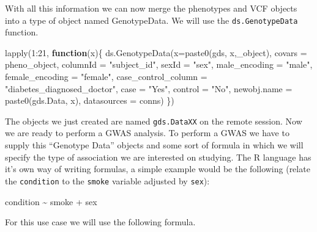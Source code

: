 \documentclass[
]{book}
\newenvironment{Shaded}{\begin{snugshade}}{\end{snugshade}}
\newcommand{\AttributeTok}[1]{\textcolor[rgb]{0.77,0.63,0.00}{#1}}
\newcommand{\ControlFlowTok}[1]{\textcolor[rgb]{0.13,0.29,0.53}{\textbf{#1}}}
\newcommand{\DecValTok}[1]{\textcolor[rgb]{0.00,0.00,0.81}{#1}}
\newcommand{\FunctionTok}[1]{\textcolor[rgb]{0.00,0.00,0.00}{#1}}
\newcommand{\NormalTok}[1]{#1}
\newcommand{\SpecialCharTok}[1]{\textcolor[rgb]{0.00,0.00,0.00}{#1}}
\newcommand{\StringTok}[1]{\textcolor[rgb]{0.31,0.60,0.02}{#1}}
\begin{document}
With all this information we can now merge the phenotypes and VCF objects into a type of object named GenotypeData. We will use the \texttt{ds.GenotypeData} function.

\begin{Shaded}
\begin{Highlighting}[]
\FunctionTok{lapply}\NormalTok{(}\DecValTok{1}\SpecialCharTok{:}\DecValTok{21}\NormalTok{, }\ControlFlowTok{function}\NormalTok{(x)\{}
  \FunctionTok{ds.GenotypeData}\NormalTok{(}\AttributeTok{x=}\FunctionTok{paste0}\NormalTok{(}\StringTok{\textquotesingle{}gds\textquotesingle{}}\NormalTok{, x,}\StringTok{\textquotesingle{}\_object\textquotesingle{}}\NormalTok{), }\AttributeTok{covars =} \StringTok{\textquotesingle{}pheno\_object\textquotesingle{}}\NormalTok{, }\AttributeTok{columnId =} \StringTok{"subject\_id"}\NormalTok{,}
                  \AttributeTok{sexId =} \StringTok{"sex"}\NormalTok{, }\AttributeTok{male\_encoding =} \StringTok{"male"}\NormalTok{, }\AttributeTok{female\_encoding =} \StringTok{"female"}\NormalTok{,}
                  \AttributeTok{case\_control\_column =} \StringTok{"diabetes\_diagnosed\_doctor"}\NormalTok{, }\AttributeTok{case =} \StringTok{"Yes"}\NormalTok{, }\AttributeTok{control =} \StringTok{"No"}\NormalTok{,}
                  \AttributeTok{newobj.name =} \FunctionTok{paste0}\NormalTok{(}\StringTok{\textquotesingle{}gds.Data\textquotesingle{}}\NormalTok{, x), }\AttributeTok{datasources =}\NormalTok{ conns)}
\NormalTok{\})}
\end{Highlighting}
\end{Shaded}

The objects we just created are named \texttt{gds.DataXX} on the remote session. Now we are ready to perform a GWAS analysis. To perform a GWAS we have to supply this ``Genotype Data'' objects and some sort of formula in which we will specify the type of association we are interested on studying. The R language has it's own way of writing formulas, a simple example would be the following (relate the \texttt{condition} to the \texttt{smoke} variable adjusted by \texttt{sex}):

\begin{Shaded}
\begin{Highlighting}[]
\NormalTok{condition }\SpecialCharTok{\textasciitilde{}}\NormalTok{ smoke }\SpecialCharTok{+}\NormalTok{ sex}
\end{Highlighting}
\end{Shaded}

For this use case we will use the following formula.
\end{document}
